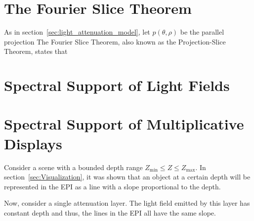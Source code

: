 \section{The Fourier Slice Theorem}

As in section~\ref{sec:light_attenuation_model}, let $p(\theta, \rho)$ be the parallel projection
The Fourier Slice Theorem, also known as the Projection-Slice Theorem, states that 


\section{Spectral Support of Light Fields}



\begin{figure}
	\centering
	
	\caption{}
	\label{fig:epi_fourier_transform_1}
\end{figure}


\section{Spectral Support of Multiplicative Displays}
\label{sec:Spectral_Support}

Consider a scene with a bounded depth range $Z_{\text{min}} \leq Z \leq Z_{\text{max}}$.
In section~\ref{sec:Visualization}, it was shown that an object at a certain depth will be represented in the EPI as a line with a slope proportional to the depth.



Now, consider a single attenuation layer. 
The light field emitted by this layer has constant depth and thus, the lines in the EPI all have the same slope.


